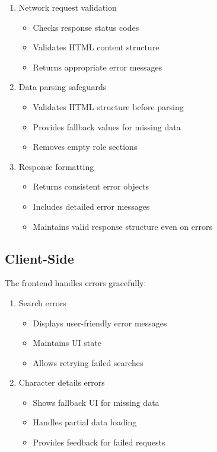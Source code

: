 \documentclass{article}
\begin{document}
\begin{enumerate}
    \item Network request validation
    \begin{itemize}
        \item Checks response status codes
        \item Validates HTML content structure
        \item Returns appropriate error messages
    \end{itemize}
    
    \item Data parsing safeguards
    \begin{itemize}
        \item Validates HTML structure before parsing
        \item Provides fallback values for missing data
        \item Removes empty role sections
    \end{itemize}
    
    \item Response formatting
    \begin{itemize}
        \item Returns consistent error objects
        \item Includes detailed error messages
        \item Maintains valid response structure even on errors
    \end{itemize}
\end{enumerate}

\subsection{Client-Side}
The frontend handles errors gracefully:

\begin{enumerate}
    \item Search errors
    \begin{itemize}
        \item Displays user-friendly error messages
        \item Maintains UI state
        \item Allows retrying failed searches
    \end{itemize}
    
    \item Character details errors
    \begin{itemize}
        \item Shows fallback UI for missing data
        \item Handles partial data loading
        \item Provides feedback for failed requests
    \end{itemize}
\end{enumerate}
\end{document}
